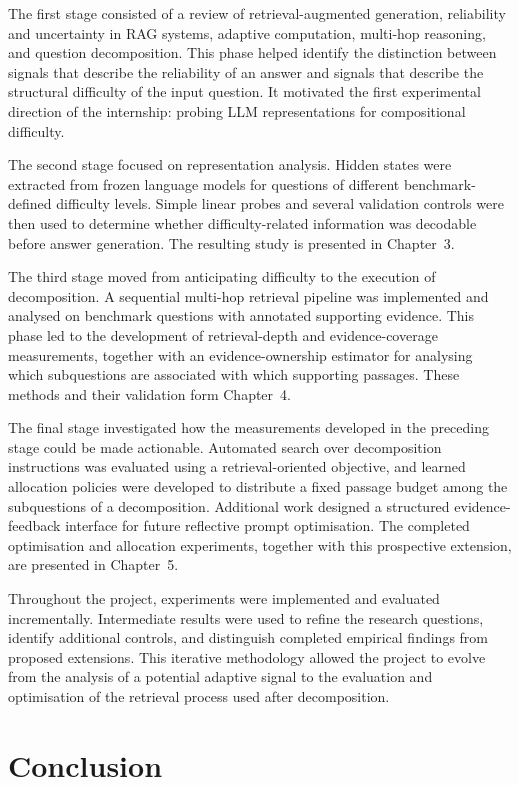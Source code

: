 The first stage consisted of a review of retrieval-augmented generation,
reliability and uncertainty in RAG systems, adaptive computation, multi-hop
reasoning, and question decomposition. This phase helped identify the distinction
between signals that describe the reliability of an answer and signals that
describe the structural difficulty of the input question. It motivated the
first experimental direction of the internship: probing LLM representations for
compositional difficulty.

The second stage focused on representation analysis. Hidden states were
extracted from frozen language models for questions of different
benchmark-defined difficulty levels. Simple linear probes and several validation
controls were then used to determine whether difficulty-related information was
decodable before answer generation. The resulting study is presented in
Chapter~3.

The third stage moved from anticipating difficulty to the execution of
decomposition. A sequential multi-hop retrieval pipeline was implemented and
analysed on benchmark questions with annotated supporting evidence. This phase
led to the development of retrieval-depth and evidence-coverage measurements,
together with an evidence-ownership estimator for analysing which subquestions
are associated with which supporting passages. These methods and their
validation form Chapter~4.

The final stage investigated how the measurements developed in the preceding
stage could be made actionable. Automated search over decomposition
instructions was evaluated using a retrieval-oriented objective, and learned
allocation policies were developed to distribute a fixed passage budget among
the subquestions of a decomposition. Additional work designed a structured
evidence-feedback interface for future reflective prompt optimisation. The
completed optimisation and allocation experiments, together with this
prospective extension, are presented in Chapter~5.

Throughout the project, experiments were implemented and evaluated
incrementally. Intermediate results were used to refine the research questions,
identify additional controls, and distinguish completed empirical findings from
proposed extensions. This iterative methodology allowed the project to evolve
from the analysis of a potential adaptive signal to the evaluation and
optimisation of the retrieval process used after decomposition.


\section*{Conclusion}
{}


